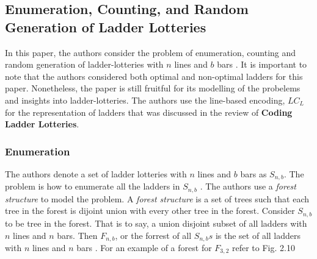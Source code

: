 \subsection{Enumeration, Counting, and Random Generation of Ladder Lotteries}

In this paper, the authors consider the problem of enumeration, counting and 
random generation of ladder-lotteries with $n$ lines and $b$ bars \cite{A6}. 
It is important to note that the authors considered both optimal and 
non-optimal ladders for this paper. Nonetheless, the paper is still fruitful 
for its modelling of the probelems and insights into ladder-lotteries.
The authors use  the line-based encoding, $LC_{L}$ for the representation of ladders 
that was discussed in the review of \textbf{Coding Ladder Lotteries}.

\subsubsection{Enumeration}
The authors denote a set of ladder lotteries with $n$ lines and 
$b$ bars as $S_{n,b}$. The problem is how to enumerate all the 
ladders in $S_{n,b}$ \cite{A6}. The authors use a \emph{forest structure}
to model the problem. A \emph{forest structure} is a set of trees 
such that each tree in the forest is dijoint union with every other 
tree in the forest. Consider $S_{n,b}$ to be tree in the forest.
That is to say, a union disjoint subset of all ladders with $n$
lines and $n$ bars. Then $F_{n,b}$, or the forrest of all $S_{n,b}s$
is the set of all ladders with $n$ lines and $n$ bars \cite{A6}. For an example 
of a forest for $F_{3,2}$ refer to Fig. 2.10\par %

